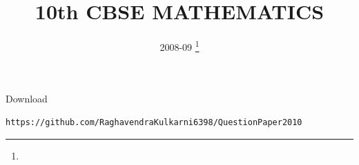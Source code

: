 \documentclass[journal,12pt,twocolumn]{IEEEtran}
\DeclareMathOperator*{\Res}{Res}
\begin{document}
\newtheorem{theorem}{Theorem}[section]
\newtheorem{problem}{Problem}
\newtheorem{proposition}{Proposition}[section]
\newtheorem{lemma}{Lemma}[section]
\newtheorem{corollary}[theorem]{Corollary}
\newtheorem{example}{Example}[section]
\newtheorem{definition}[problem]{Definition}
\newcommand{\BEQA}{\begin{eqnarray}}
\newcommand{\EEQA}{\end{eqnarray}}
\newcommand{\define}{\stackrel{\triangle}{=}}

\providecommand{\mbf}{\mathbf}
\providecommand{\pr}[1]{\ensuremath{\Pr\left(#1\right)}}
\providecommand{\qfunc}[1]{\ensuremath{Q\left(#1\right)}}
\providecommand{\sbrak}[1]{\ensuremath{{}\left[#1\right]}}
\providecommand{\lsbrak}[1]{\ensuremath{{}\left[#1\right.}}
\providecommand{\rsbrak}[1]{\ensuremath{{}\left.#1\right]}}
\providecommand{\brak}[1]{\ensuremath{\left(#1\right)}}
\providecommand{\lbrak}[1]{\ensuremath{\left(#1\right.}}
\providecommand{\rbrak}[1]{\ensuremath{\left.#1\right)}}
\providecommand{\cbrak}[1]{\ensuremath{\left\{#1\right\}}}
\providecommand{\lcbrak}[1]{\ensuremath{\left\{#1\right.}}
\providecommand{\rcbrak}[1]{\ensuremath{\left.#1\right\}}}
\theoremstyle{remark}
\newtheorem{rem}{Remark}
\newcommand{\sgn}{\mathop{\mathrm{sgn}}}
\providecommand{\abs}[1]{\left\vert#1\right\vert}
\providecommand{\res}[1]{\Res\displaylimits_{#1}} 
\providecommand{\norm}[1]{\left\lVert#1\right\rVert}
\providecommand{\mtx}[1]{\mathbf{#1}}
\providecommand{\mean}[1]{E\left[ #1 \right]}
\providecommand{\fourier}{\overset{\mathcal{F}}{ \rightleftharpoons}}
\providecommand{\system}{\overset{\mathcal{H}}{ \longleftrightarrow}}
\newcommand{\solution}{\noindent \textbf{Solution: }}
\newcommand{\cosec}{\,\text{cosec}\,}
\providecommand{\dec}[2]{\ensuremath{\overset{#1}{\underset{#2}{\gtrless}}}}
\newcommand{\myvec}[1]{\ensuremath{\begin{pmatrix}#1\end{pmatrix}}}
\newcommand{\mydet}[1]{\ensuremath{\begin{vmatrix}#1\end{vmatrix}}}
\makeatletter
{}
\makeatother
\let\StandardTheFigure\thefigure
\let\vec\mathbf
\renewcommand{\thefigure}{\theproblem}
\def\putbox#1#2#3{\makebox[0in][l]{\makebox[#1][l]{}\raisebox{\baselineskip}[0in][0in]{\raisebox{#2}[0in][0in]{#3}}}}
     \def\rightbox#1{\makebox[0in][r]{#1}}
     \def\centbox#1{\makebox[0in]{#1}}
     \def\topbox#1{\raisebox{-\baselineskip}[0in][0in]{#1}}
     \def\midbox#1{\raisebox{-0.5\baselineskip}[0in][0in]{#1}}
\vspace{3cm}
\title{10th CBSE MATHEMATICS}
\author{ 2008-09
	\thanks{}
}
\maketitle
\newpage
\bigskip
\renewcommand{\thefigure}{\theenumi}
\renewcommand{\thetable}{\theenumi}
Download 
\begin{lstlisting}
https://github.com/RaghavendraKulkarni6398/QuestionPaper2010
\end{lstlisting}
\end{document}
